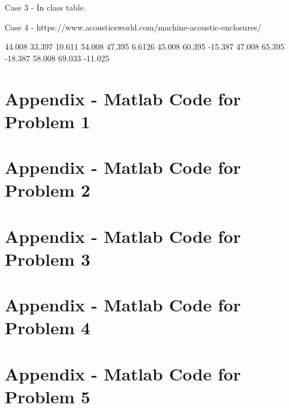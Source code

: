 {       
Case 3 - In class table.


       

Case 4 - https://www.acousticsworld.com/machine-acoustic-enclosures/

       44.008       33.397       10.611
       54.008       47.395       6.6126
       45.008       60.395      -15.387
       47.008       65.395      -18.387
       58.008       69.033      -11.025





\newpage
\section{Appendix - Matlab Code for Problem 1}
\label{appendix:problem1}




\newpage
\section{Appendix - Matlab Code for Problem 2}
\label{appendix:problem2}




\newpage
\section{Appendix - Matlab Code for Problem 3}
\label{appendix:problem3}




\newpage
\section{Appendix - Matlab Code for Problem 4}
\label{appendix:problem4}




\newpage
\section{Appendix - Matlab Code for Problem 5}
\label{appendix:problem5}

}
